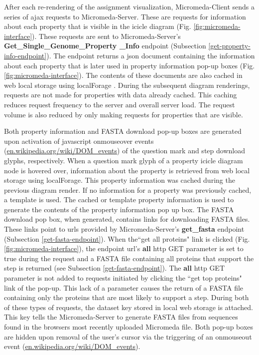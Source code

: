 After each re-rendering of the assignment visualization, Micromeda-Client sends a series of \gls{ajax}  requests to Micromeda-Server. These are requests for information about each property that is visible in the icicle diagram (Fig. \ref{fig:micromeda-interface}). These requests are sent to Micromeda-Server's \textbf{Get\_Single\_Genome\_Property \_Info} endpoint (Subsection \ref{get-property-info-endpoint}). The endpoint returns a \gls{json} document containing the information about each property that is later used in property information pop-up boxes (Fig. \ref{fig:micromeda-interface}). The contents of these documents are also cached in web local storage using localForage \cite{localforage}. During the subsequent diagram renderings, requests are not made for properties with data already cached. This caching reduces request frequency to the server and overall server load. The request volume is also reduced by only making requests for properties that are visible.

Both property information and FASTA download pop-up boxes are generated upon activation of \gls{javascript} onmouseover events \cite{dom-events} (\href{en.wikipedia.org/wiki/DOM\_events}{en.wikipedia.org/wiki/DOM\_events}) of the question mark and step download glyphs, respectively. When a question mark glyph of a property icicle diagram node is hovered over, information about the property is retrieved from web local storage using localForage. This property information was cached during the previous diagram render. If no information for a property was previously cached, a template is used. The cached or template property information is used to generate the contents of the property information pop up box. The FASTA download pop box, when generated, contains links for downloading FASTA files. These links point to \gls{url}s provided by Micromeda-Server's \textbf{get\_fasta} endpoint (Subsection \ref{get-fasta-endpoint}). When the``get all proteins" link is clicked (Fig. \ref{fig:micromeda-interface}), the endpoint \gls{url}'s \textbf{all} \gls{http} GET parameter is set to true during the request and a FASTA file containing all proteins that support the step is returned (see Subsection \ref{get-fasta-endpoint}). The \textbf{all} \gls{http} GET parameter is not added to requests initiated by clicking the ``get top proteins" link of the pop-up. This lack of a parameter causes the return of a FASTA file containing only the proteins that are most likely to support a step. During both of these types of requests, the dataset key stored in local web storage is attached. This key tells the Micromeda-Server to generate FASTA files from sequences found in the browsers most recently uploaded Micromeda file. Both pop-up boxes are hidden upon removal of the user's cursor via the triggering of an onmouseout event \cite{dom-events} (\href{en.wikipedia.org/wiki/DOM\_events}{en.wikipedia.org/wiki/DOM\_events}).

